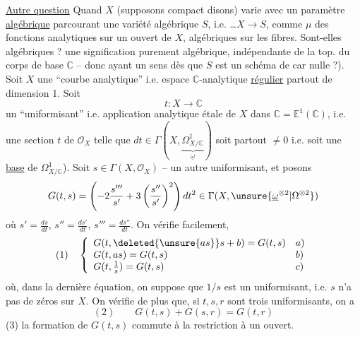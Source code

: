 \uline{Autre question} Quand $X$ (supposons compact disons) varie avec un paramètre \uline{algébrique} parcourant une variété algébrique $S$, i.e. \ldots $X\longrightarrow S$,  comme $\mu$ des fonctions analytiques sur un ouvert de $X$, algébriques sur les fibres. Sont-elles algébriques ?  une signification purement algébrique, indépendante de la top. du corps de base $\mathbb C$ -- donc ayant un sens dès que $S$ est un schéma de car nulle ?).
Soit $X$ une ``courbe analytique'' i.e. espace $\mathbb C$-analytique \uline{régulier} partout de dimension 1. Soit
\[
t:X\longrightarrow\mathbb C
\]
un ``uniformisant'' i.e.  application analytique étale de $X$ dans $\mathbb C=\mathbb E^1(\mathbb C)$, i.e. une section $t$ de $\mathcal O_X$ telle que $dt\in\Gamma(X,\underbrace{\Omega^1_{X/\mathbb C}}_{\underline\omega})$ soit partout $\ne0$ i.e. soit une \uline{base} de $\Omega^1_{X/\mathbb C}$). Soit $s\in\Gamma(X,\mathcal O_X)$ --  un autre uniformisant, et posons
\[
G(t,s)=\left(-2\frac{s'''}{s'}+3\left(\frac{s''}{s'}\right)^2\right)dt^2\in\Gamma(X,\unsure{\underline\omega^{\otimes2}|\Omega^{\otimes2}})
\]
où $s'=\frac{ds}{dt}$, $s''=\frac{ds'}{dt}$, $s'''=\frac{ds''}{dt}$. On  vérifie facilement,  
\[
(1)\quad\left\{\begin{array}{ll}
G(t,\deleted{\unsure{as}}s+b)=G(t,s)&a)\\
G(t,as)=G(t,s)&b)\\
G(t,\frac1s)=G(t,s)&c)
\end{array}\right.
\]
où, dans la dernière équation, on suppose que $1/s$ est un uniformisant, i.e. $s$ n'a pas de zéros sur $X$. On vérifie de plus que, si $t,s,r$ sont trois uniformisants, on a
\[
(2)\qquad G(t,s)+G(s,r)=G(t,r)
\]
 (3) la formation de $G(t,s)$ commute à la restriction à un ouvert. 

